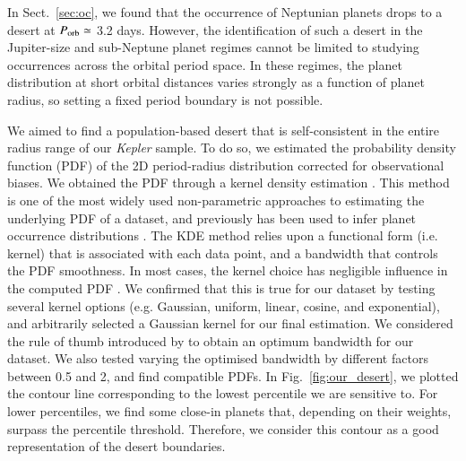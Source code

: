 \documentclass[]{aa}
\begin{document}
In Sect.~\ref{sec:oc}, we found that the occurrence of Neptunian planets drops to a desert at $P_{\rm orb} \simeq$ 3.2 days. However, the identification of such a desert in the Jupiter-size and sub-Neptune planet regimes cannot be limited to studying occurrences across the orbital period space. In these regimes, the planet distribution at short orbital distances varies strongly as a function of planet radius, so setting a fixed period boundary is not possible.

We aimed to find a population-based desert that is self-consistent in the entire radius range of our \textit{Kepler} sample. To do so, we estimated the probability density function (PDF) of the 2D period-radius distribution corrected for observational biases. We obtained the PDF through a kernel density estimation \citep[KDE;][]{Parzen_1962}. This method is one of the most widely used non-parametric approaches to estimating the underlying PDF of a dataset, and previously has been used to infer planet occurrence distributions \citep[e.g.][]{2014ApJ...791...10M,2023AJ....166..122D}. The KDE method relies upon a functional form (i.e. kernel) that is associated with each data point, and a bandwidth that controls the PDF smoothness. In most cases, the kernel choice has negligible influence in the computed PDF \citep[e.g.][]{2017arXiv170403924C}. We confirmed that this is true for our dataset by testing several kernel options (e.g. Gaussian, uniform, linear, cosine, and exponential), and arbitrarily selected a Gaussian kernel for our final estimation. We considered the rule of thumb introduced by \citet{1986desd.book.....S} to obtain an optimum bandwidth for our dataset. We also tested varying the optimised bandwidth by different factors between 0.5 and 2, and find compatible PDFs. In Fig.~\ref{fig:our_desert}, we plotted the contour line corresponding to the lowest percentile we are sensitive to. For lower percentiles, we find some close-in planets that, depending on their weights, surpass the percentile threshold. Therefore, we consider this contour as a good representation of the desert boundaries. 
\end{document}
